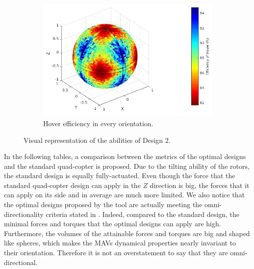\begin{figure}[!h]
{  \begin{subfigure}[b]{0.5\textwidth}
    \includegraphics[width=\linewidth]{images/Quad_design_1_hspace.jpg}
    \caption{Hover efficiency in every orientation.} \label{fig:deisgn2_hspace}
  \end{subfigure}}
  \caption{Visual representation of the abilities of Design 2.}
  \label{fig:Quadcopter2_spaces}
\end{figure}
In the following tables, a comparison between the metrics of the optimal designs
and the standard quad-copter is proposed. Due to the tilting ability of the rotors,
the standard design is equally fully-actuated. Even though the force that the standard
quad-copter design can apply in the $Z$ direction is big, the forces that it can
apply on its side and in average are much more limited. We also notice that the
optimal designs proposed by the tool are actually meeting the omni-directionality
criteria stated in . Indeed, compared to the standard
design, the minimal forces and torques that the optimal designs can apply are high.
Furthermore, the volumes of the attainable forces and torques are big and shaped
like spheres, which makes the MAVs dynamical properties nearly invariant to their
orientation. Therefore it is not an overstatement to say that they are omni-directional.
\begin{table}[!h]
\begin{center}
 \caption{Force capabilities of the designs.}\vspace{1ex}
 \label{tab:tab_Quad_compare_force}
\end{center}
\end{table}
